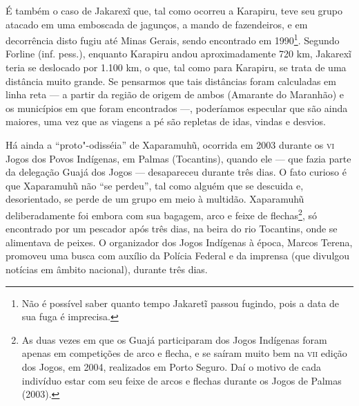 É também o caso de Jakarexĩ que, tal como ocorreu a Karapiru, teve seu
grupo atacado em uma emboscada de jagunços, a mando de fazendeiros, e em
decorrência disto fugiu até Minas Gerais, sendo encontrado em
1990\footnote{Não é possível saber quanto tempo Jakaretĩ passou fugindo,
  pois a data de sua fuga é imprecisa.}. Segundo Forline (inf. pess.),
enquanto Karapiru andou aproximadamente 720 km, Jakarexĩ teria se
deslocado por 1.100 km, o que, tal como para Karapiru, se trata de uma
distância muito grande. Se pensarmos que tais distâncias foram
calculadas em linha reta --- a partir da região de origem de ambos
(Amarante do Maranhão) e os municípios em que foram encontrados ---,
poderíamos especular que são ainda maiores, uma vez que as viagens a pé
são repletas de idas, vindas e desvios.

Há ainda a ``proto"-odisséia'' de Xaparamuhũ, ocorrida em 2003 durante os
\textsc{vi} Jogos dos Povos Indígenas, em Palmas (Tocantins), quando ele --- que
fazia parte da delegação Guajá dos Jogos --- desapareceu durante três
dias. O fato curioso é que Xaparamuhũ não ``se perdeu'', tal como alguém
que se descuida e, desorientado, se perde de um grupo em meio à
multidão. Xaparamuhũ deliberadamente foi embora com sua bagagem, arco e
feixe de flechas\footnote{As duas vezes em que os Guajá participaram dos
  Jogos Indígenas foram apenas em competições de arco e flecha, e se
  saíram muito bem na \textsc{vii} edição dos Jogos, em 2004, realizados em Porto
  Seguro. Daí o motivo de cada indivíduo estar com seu feixe de arcos e
  flechas durante os Jogos de Palmas (2003).}, só encontrado por um
pescador após três dias, na beira do rio Tocantins, onde se alimentava
de peixes. O organizador dos Jogos Indígenas à época, Marcos Terena,
promoveu uma busca com auxílio da Polícia Federal e da imprensa (que
divulgou notícias em âmbito nacional), durante três dias.

